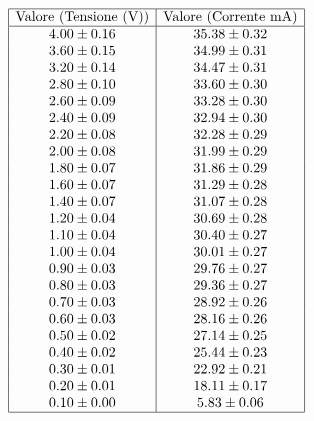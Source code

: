 \documentclass[a4paper,11pt]{article}
\begin{document}
\[
\begin{array}{|c|c|}
\hline
\text{Valore (Tensione (V))} & \text{Valore (Corrente mA)} \\ \hline
4.00 \pm 0.16 & 35.38 \pm 0.32 \\ 
3.60 \pm 0.15 & 34.99 \pm 0.31 \\ 
3.20 \pm 0.14 & 34.47 \pm 0.31 \\ 
2.80 \pm 0.10 & 33.60 \pm 0.30 \\ 
2.60 \pm 0.09 & 33.28 \pm 0.30 \\ 
2.40 \pm 0.09 & 32.94 \pm 0.30 \\ 
2.20 \pm 0.08 & 32.28 \pm 0.29 \\ 
2.00 \pm 0.08 & 31.99 \pm 0.29 \\ 
1.80 \pm 0.07 & 31.86 \pm 0.29 \\ 
1.60 \pm 0.07 & 31.29 \pm 0.28 \\ 
1.40 \pm 0.07 & 31.07 \pm 0.28 \\ 
1.20 \pm 0.04 & 30.69 \pm 0.28 \\ 
1.10 \pm 0.04 & 30.40 \pm 0.27 \\ 
1.00 \pm 0.04 & 30.01 \pm 0.27 \\ 
0.90 \pm 0.03 & 29.76 \pm 0.27 \\ 
0.80 \pm 0.03 & 29.36 \pm 0.27 \\ 
0.70 \pm 0.03 & 28.92 \pm 0.26 \\ 
0.60 \pm 0.03 & 28.16 \pm 0.26 \\ 
0.50 \pm 0.02 & 27.14 \pm 0.25 \\ 
0.40 \pm 0.02 & 25.44 \pm 0.23 \\ 
0.30 \pm 0.01 & 22.92 \pm 0.21 \\ 
0.20 \pm 0.01 & 18.11 \pm 0.17 \\ 
0.10 \pm 0.00 & 5.83 \pm 0.06 \\ \hline
\end{array}
\]
\end{document}
